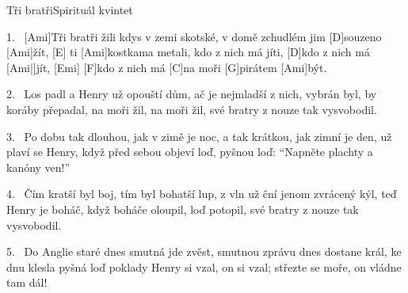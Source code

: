 \begin{song}{Tři bratři}{Spirituál kvintet}

\begin{xverse}{1.~}
[\large Ami]Tři bratři žili kdys v zemi skotské,
v domě zchudlém jim [\large D]souzeno [\large Ami]{žít}, [\large E]{}
ti [\large Ami]kostkama metali, kdo z nich má jíti,
[\large D]kdo z nich má [\large Ami|]{jít,} [\large Emi]{}
[\large F]kdo z nich má [\large C]na moři [\large G]pirátem [\large Ami]být.
\end{xverse}


\begin{xverse}{2.~}
Los padl a Henry už opouští dům,
ač je nejmladší z nich, vybrán byl,
by koráby přepadal, na moři žil,
na moři žil,
své bratry z nouze tak vysvobodil.
\end{xverse}


\begin{xverse}{3.~}
Po dobu tak dlouhou, jak v zimě je noc,
a tak krátkou, jak zimní je den,
už plaví se Henry, když před sebou objeví
loď, pyšnou loď:
``Napněte plachty a kanóny ven!''
\end{xverse}


\begin{xverse}{4.~}
Čím kratší byl boj, tím byl bohatší lup,
z vln už ční jenom zvrácený kýl,
teď Henry je boháč, když boháče oloupil,
loď potopil,
své bratry z nouze tak vysvobodil.
\end{xverse}


\begin{xverse}{5.~}
Do Anglie staré dnes smutná jde zvěst,
smutnou zprávu dnes dostane král,
ke dnu klesla pyšná loď poklady Henry si
vzal, on si vzal;
střezte se moře, on vládne tam dál!
\end{xverse}
\end{song}

